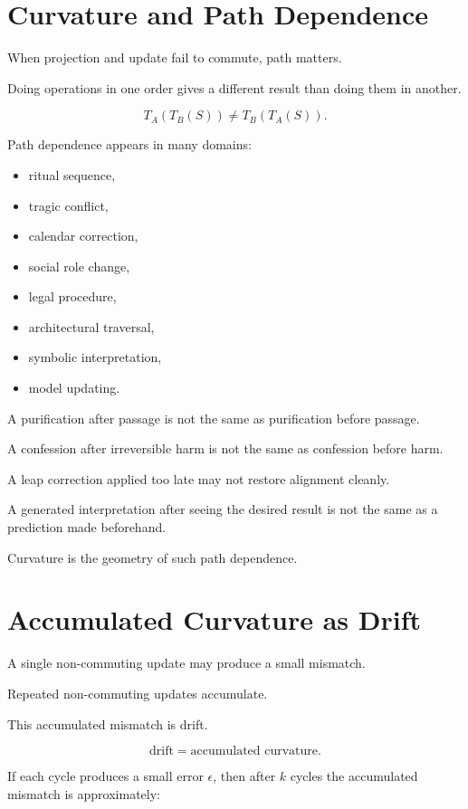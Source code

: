 \documentclass[11pt]{book}
\begin{document}
\section{Curvature and Path Dependence}

When projection and update fail to commute, path matters.

Doing operations in one order gives a different result than doing them in another.

\[
T_A(T_B(S)) \neq T_B(T_A(S)).
\]

Path dependence appears in many domains:

\begin{itemize}
    \item ritual sequence,
    \item tragic conflict,
    \item calendar correction,
    \item social role change,
    \item legal procedure,
    \item architectural traversal,
    \item symbolic interpretation,
    \item model updating.
\end{itemize}

A purification after passage is not the same as purification before passage.

A confession after irreversible harm is not the same as confession before harm.

A leap correction applied too late may not restore alignment cleanly.

A generated interpretation after seeing the desired result is not the same as a prediction made beforehand.

Curvature is the geometry of such path dependence.

\section{Accumulated Curvature as Drift}

A single non-commuting update may produce a small mismatch.

Repeated non-commuting updates accumulate.

This accumulated mismatch is drift.

\[
\text{drift} = \text{accumulated curvature}.
\]

If each cycle produces a small error \(\epsilon\), then after \(k\) cycles the accumulated mismatch is approximately:
\end{document}
